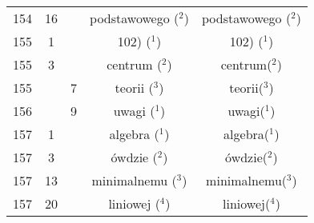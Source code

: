 \documentclass[a4paper,11pt]{article}
\begin{document}
\begin{center}
\begin{tabular}{|c|c|c|c|c|}
    154 & 16 & & podstawowego ($^{ 2 }$) & podstawowego ($^{ 2 }$) \\
    155 &  1 & & 102) ($^{ 1 }$) & 102) ($^{ 1 }$) \\
    155 &  3 & & centrum ($^{ 2 }$) & centrum($^{ 2 }$) \\
    155 & &  7 & teorii ($^{ 3 }$) & teorii($^{ 3 }$) \\
    156 & &  9 & uwagi ($^{ 1 }$) & uwagi($^{ 1 }$) \\
    157 &  1 & & algebra ($^{ 1 }$) & algebra($^{ 1 }$) \\
    157 &  3 & & ówdzie ($^{ 2 }$) & ówdzie($^{ 2 }$) \\
    157 & 13 & & minimalnemu ($^{ 3 }$) & minimalnemu($^{ 3 }$) \\
    157 & 20 & & liniowej ($^{ 4 }$) & liniowej($^{ 4 }$) \\
    \hline
  \end{tabular}






\end{center}
\end{document}
